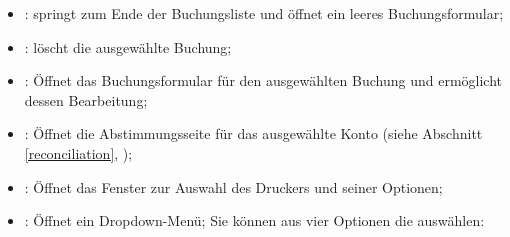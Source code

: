 \begin{itemize}
	\item {}: springt zum Ende der Buchungsliste und öffnet ein leeres Buchungsformular;
	\item {}: löscht die ausgewählte Buchung;
	\item {}: Öffnet das Buchungsformular für den ausgewählten Buchung und ermöglicht dessen Bearbeitung;
	\item {}: Öffnet die Abstimmungsseite für das ausgewählte Konto (siehe Abschnitt \vref{reconciliation}, );
	\item {}: Öffnet das Fenster zur Auswahl des Druckers und seiner Optionen;
	\item {}: Öffnet ein Dropdown-Menü; Sie können aus vier Optionen die  auswählen:

\end{itemize}
